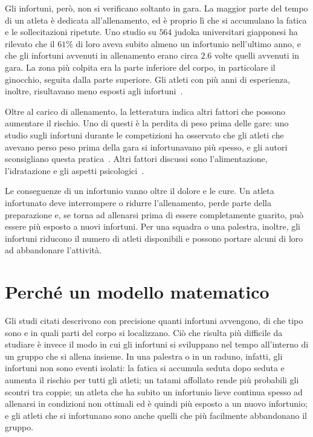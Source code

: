 Gli infortuni, però, non si verificano soltanto in gara. La maggior parte del tempo di un atleta è dedicata all'allenamento, ed è proprio lì che si accumulano la fatica e le sollecitazioni ripetute. Uno studio su $564$ judoka universitari giapponesi ha rilevato che il $61\%$ di loro aveva subito almeno un infortunio nell'ultimo anno, e che gli infortuni avvenuti in allenamento erano circa $2.6$ volte quelli avvenuti in gara. La zona più colpita era la parte inferiore del corpo, in particolare il ginocchio, seguita dalla parte superiore. Gli atleti con più anni di esperienza, inoltre, risultavano meno esposti agli infortuni~\cite{kinoda2024}. \par

Oltre al carico di allenamento, la letteratura indica altri fattori che possono aumentare il rischio. Uno di questi è la perdita di peso prima delle gare: uno studio sugli infortuni durante le competizioni ha osservato che gli atleti che avevano perso peso prima della gara si infortunavano più spesso, e gli autori sconsigliano questa pratica~\cite{green2007}. Altri fattori discussi sono l'alimentazione, l'idratazione e gli aspetti psicologici~\cite{pocecco2013}. \par

Le conseguenze di un infortunio vanno oltre il dolore e le cure. Un atleta infortunato deve interrompere o ridurre l'allenamento, perde parte della preparazione e, se torna ad allenarsi prima di essere completamente guarito, può essere più esposto a nuovi infortuni. Per una squadra o una palestra, inoltre, gli infortuni riducono il numero di atleti disponibili e possono portare alcuni di loro ad abbandonare l'attività.

\section{Perché un modello matematico}

Gli studi citati descrivono con precisione quanti infortuni avvengono, di che tipo sono e in quali parti del corpo si localizzano. Ciò che risulta più difficile da studiare è invece il modo in cui gli infortuni si sviluppano nel tempo all'interno di un gruppo che si allena insieme. In una palestra o in un raduno, infatti, gli infortuni non sono eventi isolati: la fatica si accumula seduta dopo seduta e aumenta il rischio per tutti gli atleti; un tatami affollato rende più probabili gli scontri tra coppie; un atleta che ha subito un infortunio lieve continua spesso ad allenarsi in condizioni non ottimali ed è quindi più esposto a un nuovo infortunio; e gli atleti che si infortunano sono anche quelli che più facilmente abbandonano il gruppo. \par

